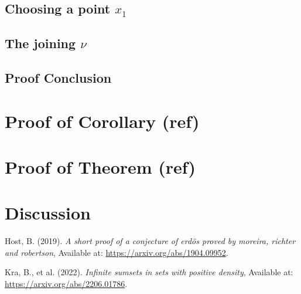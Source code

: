 \documentclass[
  british,
]{article}
\newlength{\cslhangindent}
\newenvironment{CSLReferences}[2] %
 {\begin{list}{}{%
  \setlength{\itemindent}{0pt}
  \setlength{\leftmargin}{0pt}
  \setlength{\parsep}{0pt}
  \ifodd #1
   \setlength{\leftmargin}{\cslhangindent}
   \setlength{\itemindent}{-1\cslhangindent}
  \fi
  \setlength{\itemsep}{#2\baselineskip}}}
 {\end{list}}
\theoremstyle{plain}
\theoremstyle{definition}
\theoremstyle{remark}
\begin{document}
\subsection{\texorpdfstring{Choosing a point
\(x_1\)}{Choosing a point x\_1}}\label{choosing-a-point-x_1}

\subsection{\texorpdfstring{The joining
\(\nu\)}{The joining \textbackslash nu}}\label{the-joining-nu}

\subsection{Proof Conclusion}\label{proof-conclusion}

\section{Proof of Corollary (ref)}\label{proof-of-corollary-ref}

\section{Proof of Theorem (ref)}\label{proof-of-theorem-ref-1}

\section*{Discussion}\label{discussion}

\label{refs}
\begin{CSLReferences}{1}{0}
Host, B. (2019). \textquotesingle{}\emph{A short proof of a conjecture
of erdös proved by moreira, richter and robertson}\textquotesingle,
Available at: \url{https://arxiv.org/abs/1904.09952}.

Kra, B., et al. (2022). \textquotesingle{}\emph{Infinite sumsets in sets
with positive density}\textquotesingle, Available at:
\url{https://arxiv.org/abs/2206.01786}.

\end{CSLReferences}
\end{document}
